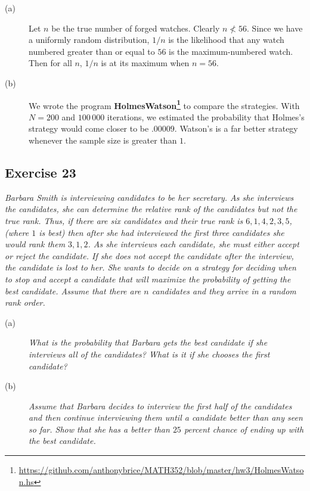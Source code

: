 \documentclass{tufte-handout}
\begin{document}
\begin{description}
\item[\rm (a)] Let $n$ be the true number of forged watches. Clearly
  $n \nless 56$. Since we have a uniformly random distribution, $1/n$
  is the likelihood that any watch numbered greater than or equal to
  $56$ is the maximum-numbered watch. Then for all $n$,
  $1/n$ is at its maximum when $n = 56$.
\item[\rm (b)] We wrote the program
  \textbf{HolmesWatson\footnote{\url{https://github.com/anthonybrice/MATH352/blob/master/hw3/HolmesWatson.hs}}}
  to compare the strategies. With $N = 200$ and $100\,000$ iterations,
  we estimated the probability that Holmes's strategy would come
  closer to be $.00009$. Watson's is a far better strategy whenever
  the sample size is greater than $1$.
\end{description}

\subsection{Exercise 23}
\begin{description}
\item \emph{Barbara Smith is interviewing candidates to be her
    secretary. As she interviews the candidates, she can determine the
    relative rank of the candidates but not the true rank. Thus, if
    there are six candidates and their true rank is $6, 1, 4, 2, 3,
    5$, (where $1$ is best) then after she had interviewed the first
    three candidates she would rank them $3, 1, 2$. As she interviews
    each candidate, she must either accept or reject the candidate. If
    she does not accept the candidate after the interview, the
    candidate is lost to her. She wants to decide on a strategy for
    deciding when to stop and accept a candidate that will maximize
    the probability of getting the best candidate. Assume that there
    are $n$ candidates and they arrive in a random rank order.}
  \begin{description}
  \item[(a)] \emph{What is the probability that Barbara gets the best
      candidate if she interviews all of the candidates? What is it if
      she chooses the first candidate?}
  \item[(b)] \emph{Assume that Barbara decides to interview the first
      half of the candidates and then continue interviewing them until
      a candidate better than any seen so far. Show that she has a
      better than $25$ percent chance of ending up with the best
      candidate.}
  \end{description}
\end{description}
\end{document}
